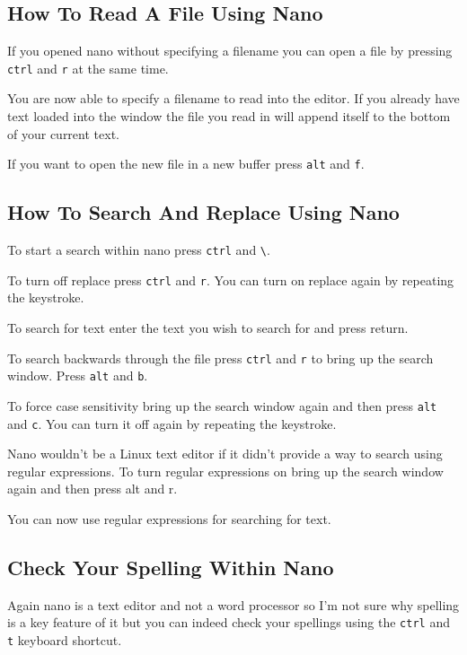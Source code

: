 \subsection{How To Read A File Using Nano}
If you opened nano without specifying a filename you can open a file by pressing \texttt{ctrl}  and
\texttt{r} at the same time.

You are now able to specify a filename to read into the editor. If you already have text loaded into
the window the file you read in will append itself to the bottom of your current text.

If you want to open the new file in a new buffer press \texttt{alt} and \texttt{f}.

\subsection{How To Search And Replace Using Nano}
To start a search within nano press \texttt{ctrl}  and \texttt{\textbackslash}. 

To turn off replace press \texttt{ctrl}  and \texttt{r}. You can turn on replace again by repeating
the keystroke.

To search for text enter the text you wish to search for and press return.

To search backwards through the file press \texttt{ctrl}  and \texttt{r} to bring up the search
window. Press \texttt{alt} and \texttt{b}.

To force case sensitivity bring up the search window again and then press \texttt{alt} and
\texttt{c}. You can turn it off again by repeating the keystroke.

Nano wouldn't be a Linux text editor if it didn't provide a way to search using regular expressions.
To turn regular expressions on bring up the search window again and then press alt and r.

You can now use regular expressions for searching for text.

\subsection{Check Your Spelling Within Nano}
Again nano is a text editor and not a word processor so I'm not sure why spelling is a key feature
of it but you can indeed check your spellings using the \texttt{ctrl}  and \texttt{t} keyboard shortcut.

